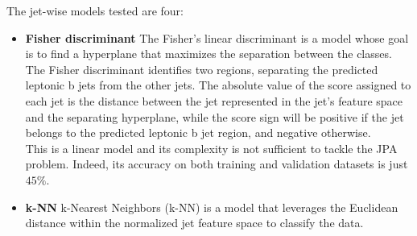 The jet-wise models tested are four: 
\begin{itemize}
    \item \textbf{Fisher discriminant} The Fisher's linear discriminant \cite{FISHER1936THEPROBLEMS} is a model whose goal is to find a hyperplane that maximizes the separation between the classes.\\
    The Fisher discriminant identifies two regions, separating the predicted leptonic b jets from the other jets. The absolute value of the score assigned to each jet is the distance between the jet represented in the jet's feature space and the separating hyperplane, while the score sign will be positive if the jet belongs to the predicted leptonic b jet region, and negative otherwise.
    \\
    This is a linear model and its complexity is not sufficient to tackle the JPA problem. Indeed, its accuracy on both training and validation datasets is just $45\%$.
    \item \textbf{k-NN}
    k-Nearest Neighbors (k-NN) \cite{Cunningham2020K-NearestExamples} is a model that leverages the Euclidean distance within the normalized jet feature space to classify the data.
    

\end{itemize}
